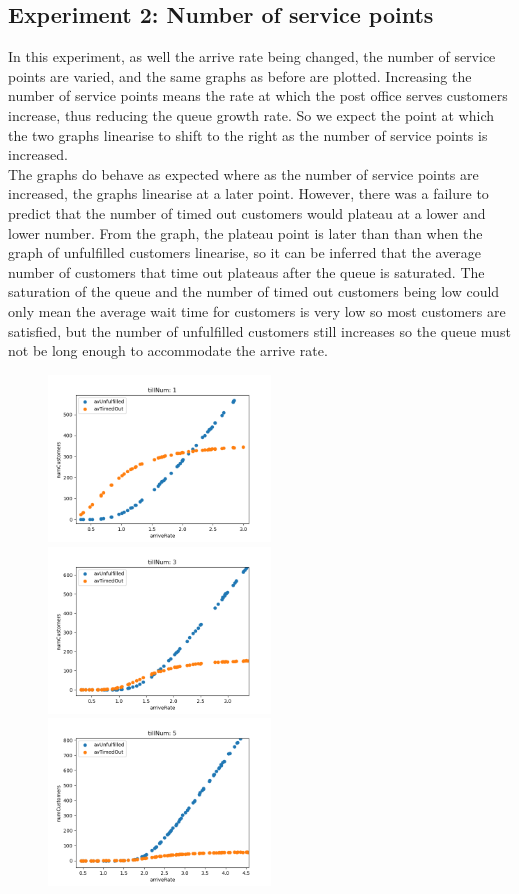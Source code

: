 \documentclass{article}
\begin{document}
\subsection{Experiment 2: Number of service points}
In this experiment, as well the arrive rate being changed, the number of service points are varied, and the same graphs as before are plotted. Increasing the number of service points means the rate at which the post office serves customers increase, thus reducing the queue growth rate. So we expect the point at which the two graphs linearise to shift to the right as the number of service points is increased.
\\
The graphs do behave as expected where as the number of service points are increased, the graphs linearise at a later point. However, there was a failure to predict that the number of timed out customers would plateau at a lower and lower number. From the graph, the plateau point is later than than when the graph of unfulfilled customers linearise, so it can be inferred that the average number of customers that time out plateaus after the queue is saturated. The saturation of the queue and the number of timed out customers being low could only mean the average wait time for customers is very low so most customers are satisfied, but the number of unfulfilled customers still increases so the queue must not be long enough to accommodate the arrive rate.
\begin{figure}[h]
\includegraphics[width=5.9cm]{tillNum_1.png}
\includegraphics[width=5.9cm]{tillNum_3.png}
\includegraphics[width=5.9cm]{tillNum_5.png}
\end{figure}
\end{document}
